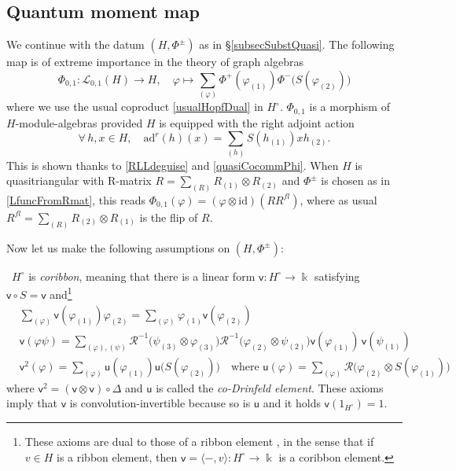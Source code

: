 \documentclass[11pt]{amsart}
\begin{document}
\subsection{Quantum moment map}\label{subsecQMMgeneral}
We continue with the datum $(H,\Phi^\pm)$ as in \S\ref{subsecSubstQuasi}. The following map is of extreme importance in the theory of graph algebras
\begin{equation}\label{RSDphi}
\Phi_{0,1} : \mathcal{L}_{0,1}(H) \to H, \quad \varphi \mapsto \sum_{(\varphi)} \Phi^+(\varphi_{(1)})\Phi^-\bigl( S(\varphi_{(2)}) \bigr)
\end{equation}
where we use the usual coproduct \eqref{usualHopfDual} in $H^\circ$.  $\Phi_{0,1}$ is a morphism of $H$-module-algebras provided $H$ is equipped with the right adjoint action
\begin{equation}\label{defAdr}
\forall \, h,x \in H, \quad \mathrm{ad}^r(h)(x) = \sum_{(h)} S(h_{(1)})xh_{(2)}.
\end{equation}
This is shown thanks to \eqref{RLLdeguise} and \eqref{quasiCocommPhi}. When $H$ is quasitriangular with R-matrix $\textstyle R = \sum_{(R)} R_{(1)} \otimes R_{(2)}$ and $\Phi^\pm$ is chosen as in \eqref{LfuncFromRmat}, this reads $\Phi_{0,1}(\varphi) = (\varphi \otimes \mathrm{id})(RR^{fl})$, where as usual $\textstyle R^{fl} = \sum_{(R)} R_{(2)} \otimes R_{(1)}$ is the flip of $R$.

\smallskip

\indent Now let us make the following assumptions on $(H,\Phi^\pm)$:

\smallskip

\indent \textbullet ~$H^\circ$ is {\em coribbon}, meaning that there is a  linear form $\mathsf{v} : H^\circ \to \Bbbk$ satisfying $\mathsf{v} \circ S = \mathsf{v}$ and\footnote{These axioms are dual to those of a ribbon element \cite[\S 4.2.C]{CP}, in the sense that if $v \in H$ is a ribbon element, then $\mathsf{v} = \langle -,v \rangle : H^\circ \to \Bbbk$ is a coribbon element.}
 \begin{align}
&\textstyle \sum_{(\varphi)} \mathsf{v}(\varphi_{(1)})\varphi_{(2)} = \sum_{(\varphi)}\varphi_{(1)}\mathsf{v}(\varphi_{(2)})\label{coribbonCocentral}\\
&\textstyle \mathsf{v}(\varphi\psi) = \sum_{(\varphi),(\psi)}\mathcal{R}^{-1}\bigl( \psi_{(3)} \otimes \varphi_{(3)} \bigr) \mathcal{R}^{-1}\bigl( \varphi_{(2)} \otimes \psi_{(2)} \bigr) \mathsf{v}(\varphi_{(1)}) \, \mathsf{v}(\psi_{(1)})\label{axiomCoribbonProduct}\\
&\mathsf{v}^2(\varphi) = \textstyle \sum_{(\varphi)}\mathsf{u}(\varphi_{(1)}) \mathsf{u}\bigl( S(\varphi_{(2)}) \bigr) \quad \text{where } \mathsf{u}(\varphi) = \sum_{(\varphi)}\mathcal{R}\bigl( \varphi_{(2)}\otimes S(\varphi_{(1)}) \bigr) \label{axiomCorribonSquare}
\end{align}
where $\mathsf{v}^2 = (\mathsf{v} \otimes \mathsf{v}) \circ \Delta$ and $\mathsf{u}$ is called the {\em co-Drinfeld element}. These axioms imply that $\mathsf{v}$ is convolution-invertible because so is $\mathsf{u}$ \cite[Prop.\,2.2.4]{Majid} and it holds $\mathsf{v}(1_{H^\circ}) = 1$.
\end{document}
